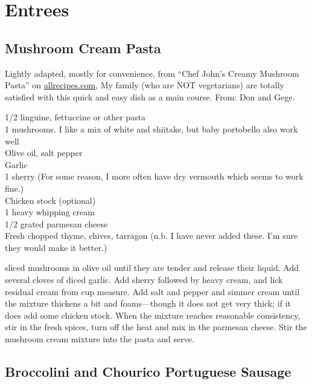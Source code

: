 \chapter{Entrees}

\section{Mushroom Cream Pasta}

\begin{open}
    Lightly adapted, mostly for convenience, from ``Chef John's Creamy Mushroom
    Pasta'' on \url{allrecipes.com}, My family (who are NOT vegetarians) are
    totally satisfied with this quick and easy dish as a main course. From: Don
    and Gege.
\end{open}
\begin{ingredients}
    \SI{1/2}{\pound} linguine, fettuccine or other pasta\\
    \SI{1}{\pound} mushrooms. I like a mix of white and shiitake, but baby
    portobello also work well\\
    Olive oil, salt pepper\\
    Garlic\\
    \SI{1}{\tblspoon} sherry (For some reason, I more often have dry vermouth
    which seems to work fine.) \\
    Chicken stock (optional)\\
    \SI{1}{\cup} heavy whipping cream\\
    \SI{1/2}{\cup} grated parmesan cheese\\
    Fresh chopped thyme, chives, tarragon (n.b. I have never added these. I'm
    sure  they would make it better.)\\
\end{ingredients}
\Saute sliced mushrooms in olive oil until they are tender and release their
liquid. Add several cloves of diced garlic. Add sherry followed by heavy cream,
and lick residual cream from cup measure. Add salt and pepper and simmer cream
until the mixture thickens a bit and foams---though it does not get very thick;
if it does add some chicken stock. When the mixture reaches reasonable
consistency, stir in the fresh spices, turn off the heat and mix in the parmesan
cheese. Stir the mushroom cream mixture into the pasta and serve.

\section{Broccolini and Chourico Portuguese Sausage}

